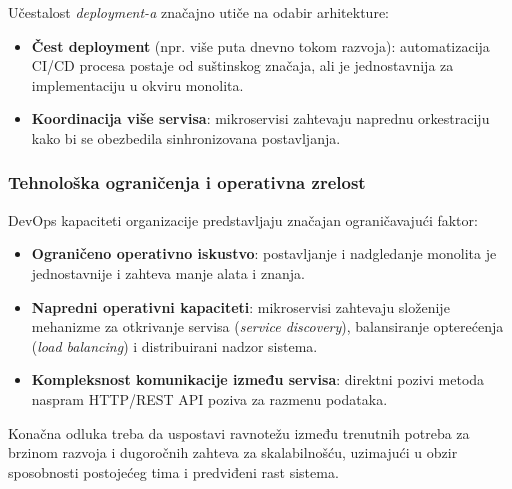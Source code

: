 \documentclass[12pt]{article}
\begin{document}
    Učestalost \textit{deployment-a} značajno utiče na odabir arhitekture:
    \begin{itemize}
        \item \textbf{Čest deployment} (npr. više puta dnevno tokom razvoja): automatizacija CI/CD procesa postaje od suštinskog značaja, ali je jednostavnija za implementaciju u okviru monolita.
        \item \textbf{Koordinacija više servisa}: mikroservisi zahtevaju naprednu orkestraciju kako bi se obezbedila sinhronizovana postavljanja.
    \end{itemize}

    \subsubsection*{Tehnološka ograničenja i operativna zrelost}

    DevOps kapaciteti organizacije predstavljaju značajan ograničavajući faktor:
    \begin{itemize}
        \item \textbf{Ograničeno operativno iskustvo}: postavljanje i nadgledanje monolita je jednostavnije i zahteva manje alata i znanja.
        \item \textbf{Napredni operativni kapaciteti}: mikroservisi zahtevaju složenije mehanizme za otkrivanje servisa (\textit{service discovery}), balansiranje opterećenja (\textit{load balancing}) i distribuirani nadzor sistema.
        \item \textbf{Kompleksnost komunikacije između servisa}: direktni pozivi metoda naspram HTTP/REST API poziva za razmenu podataka.
    \end{itemize}

    Konačna odluka treba da uspostavi ravnotežu između trenutnih potreba za brzinom razvoja i dugoročnih zahteva za skalabilnošću, uzimajući u obzir sposobnosti postojećeg tima i predviđeni rast sistema.



\newpage
\printbibliography[title={Literatura}]
\end{document}
